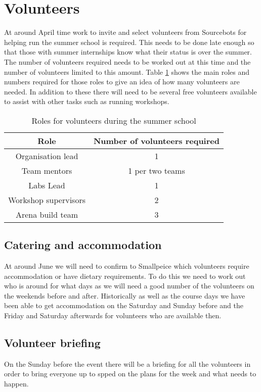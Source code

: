 \section{Volunteers}

At around April time work to invite and select volunteers from Sourcebots for helping run the summer school is required.
This needs to be done late enough so that those with summer internships know what their status is over the summer.
The number of volunteers required needs to be worked out at this time and the number of volunteers limited to this amount.
Table \ref{tab:volunteerroles} shows the main roles and numbers required for those roles to give an idea of how many volunteers are needed.
In addition to these there will need to be several free volunteers available to assist with other tasks such as running workshops.

\begin{table}
    \centering
    \begin{tabular}{cc}
        Role & Number of volunteers required \\
        \hline
        Organisation lead & 1 \\
        Team mentors & 1 per two teams \\
        Labs Lead & 1 \\
        Workshop supervisors & 2 \\
        Arena build team & 3\\
    \end{tabular}
    \caption{Roles for volunteers during the summer school}
    \label{tab:volunteerroles}
\end{table}


\subsection{Catering and accommodation}

At around June we will need to confirm to Smallpeice which volunteers require accommodation or have dietary requirements.
To do this we need to work out who is around for what days as we will need a good number of the volunteers on the weekends before and after.
Historically as well as the course days we have been able to get accommodation on the Saturday and Sunday before and the Friday and Saturday afterwards for volunteers who are available then.


\subsection{Volunteer briefing}

On the Sunday before the event there will be a briefing for all the volunteers in order to bring everyone up to spped on the plans for the week and what needs to happen.

